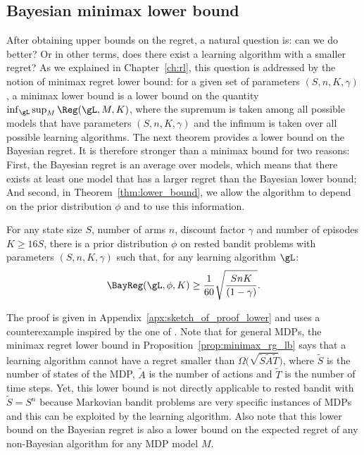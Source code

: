 \subsection{Bayesian minimax lower bound}
\label{ssec:lowerbound}

After obtaining upper bounds on the regret, a natural question is: can we do better? Or in other terms, does there exist a learning algorithm with a smaller regret? As we explained in Chapter~\ref{ch:rl}, this question is addressed by the notion of minimax regret lower bound: for a given set of parameters $(S,n,K,\gamma)$, a minimax lower bound is a lower bound on the quantity 
$\inf_{\gL}\sup_{M}\Reg(\gL,M,K)$,  where the supremum is taken among all possible models that have parameters $(S,n,K,\gamma)$ and the infimum is taken over all possible learning algorithms. The next theorem provides a lower bound on the Bayesian regret. It is therefore stronger than a minimax bound for two reasons: First, the Bayesian regret is an average over models, which means that there exists at least one model that has a larger regret than the Bayesian lower bound; And second,  in Theorem~\ref{thm:lower_bound}, we allow the algorithm to depend on the prior distribution $\phi$ and to use this information.
\begin{thm}
    \label{thm:lower_bound}
    For any state size $S$, number of arms $n$, discount factor $\gamma$ and number of episodes $K\ge 16S$, there is a prior distribution $\phi$ on rested bandit problems with parameters $(S,n,K,\gamma)$ such that, for any learning algorithm $\gL$:
    \begin{align}
        \label{eq:thm2}
        \BayReg(\gL,\phi,K) \geq \frac1{60}\sqrt{\frac{{SnK}}{(1-\gamma)}}.
    \end{align}
\end{thm}
The proof is given in Appendix~\ref{apx:sketch_of_proof_lower} and uses a counterexample inspired by the one of \cite{jaksch2010near}. Note that for general MDPs, the minimax regret lower bound in Proposition~\ref{prop:minimax_rg_lb} says that a learning algorithm cannot have a regret smaller than $\Omega\big(\sqrt{\tilde{S}\tilde{A}\tilde{T}}\big)$, where $\tilde{S}$ is the number of states of the MDP, $\tilde{A}$ is the number of actions and $\tilde{T}$ is the number of time steps. 
Yet, this lower bound is not directly applicable to rested bandit with $\tilde{S}=S^n$ because Markovian bandit problems are very specific instances of MDPs and this can be exploited by the  learning algorithm.
Also note that this lower bound on the Bayesian regret is also a lower bound on the expected regret of any non-Bayesian algorithm for any MDP model $M$.

